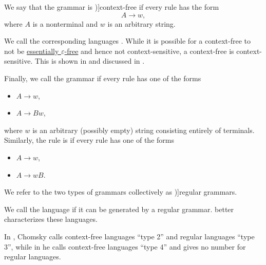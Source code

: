 \begin{definition}
\begin{thmenum}
     We say that the grammar is \term[ru=безконтекстная / контекстно-свободная (грамматика) (\cite[29]{Гладкий1973Языки})]{context-free} if every rule has the form
    \begin{equation*}
      A \to w,
    \end{equation*}
    where \( A \) is a nonterminal and \( w \) is an arbitrary string.

    We call the corresponding languages . While it is possible for a context-free  to not be \hyperref[def:epsilon_free_grammar]{essentially \( \varepsilon \)-free} and hence not context-sensitive, a context-free  is context-sensitive. This is shown in  and discussed in .

     Finally, we call the grammar  if every rule has one of the forms
    \begin{itemize}
      \item \( A \to w \),
      \item \( A \to B w \),
    \end{itemize}
    where \( w \) is an arbitrary (possibly empty) string consisting entirely of terminals. Similarly, the rule is  if every rule has one of the forms
    \begin{itemize}
      \item \( A \to w \),
      \item \( A \to w B \).
    \end{itemize}

    We refer to the two types of grammars collectively as \term[ru=автоматная (грамматика) (\cite[29]{Гладкий1973Языки})]{regular grammars}.

    We call the language  if it can be generated by a regular grammar.  better characterizes these languages.
  \end{thmenum}
\end{definition}
\begin{comments}
  \item In \cite[142]{Chomsky1959Grammars}, Chomsky calls context-free languages \enquote{type 2} and regular languages \enquote{type 3}, while in \cite[366]{Chomsky1963Grammars} he calls context-free languages \enquote{type 4} and gives no number for regular languages.
\end{comments}

